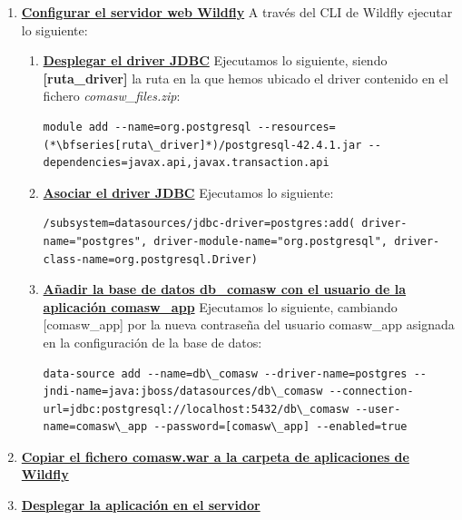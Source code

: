 \begin{enumerate}
\begin{enumerate}
	\item \underline{\textbf{Importar la base de datos \emph{\textbf{db\_comasw}}}}.\\
Desde el terminal nos colocamos en la ruta en la que hemos descomprimido el fichero y ejecutamos lo siguiente:
\begin{lstlisting}[style=comando]
  $ psql -U postgres db_comasw < db_comasw.sql
\end{lstlisting}

	\end{enumerate}
\item \underline{\textbf{Configurar el servidor web Wildfly}}\newline
A través del CLI de Wildfly ejecutar lo siguiente:

	\begin{enumerate}
	\item  \underline{\textbf{Desplegar el driver JDBC}}\newline
Ejecutamos lo siguiente, siendo \textbf{[ruta\_driver]} la ruta en la que hemos ubicado el driver contenido en el fichero \emph{comasw\_files.zip}:
\begin{lstlisting}[style=comando]
  module add --name=org.postgresql --resources=(*\bfseries[ruta\_driver]*)/postgresql-42.4.1.jar --dependencies=javax.api,javax.transaction.api
\end{lstlisting}

	\item \underline{\textbf{Asociar el driver JDBC}}\newline
Ejecutamos lo siguiente:
\begin{lstlisting}[style=comando]
/subsystem=datasources/jdbc-driver=postgres:add( driver-name="postgres", driver-module-name="org.postgresql", driver-class-name=org.postgresql.Driver)
\end{lstlisting}

\item \underline{\textbf{Añadir la base de datos db\_comasw con el usuario de la aplicación comasw\_app}}\newline
Ejecutamos lo siguiente, cambiando [comasw\_app] por la nueva contraseña del usuario comasw\_app asignada en la configuración de la base de datos:
\begin{lstlisting}[style=comando]
data-source add --name=db\_comasw --driver-name=postgres --jndi-name=java:jboss/datasources/db\_comasw --connection-url=jdbc:postgresql://localhost:5432/db\_comasw --user-name=comasw\_app --password=[comasw\_app] --enabled=true
\end{lstlisting}
	\end{enumerate}

\item \underline{\textbf{Copiar el fichero comasw.war a la carpeta de aplicaciones de Wildfly}}
\item \underline{\textbf{Desplegar la aplicación en el servidor}}
\end{enumerate}


